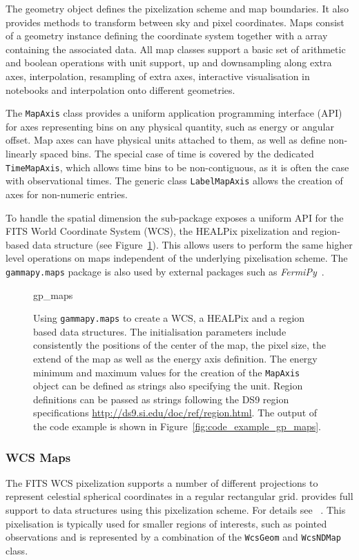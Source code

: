 \documentclass[longauth]{aa}
\newcommand{\code}[1]{\texttt{#1}}
\begin{document}
The geometry object defines the pixelization scheme and map boundaries. It also
provides methods to transform between sky and pixel coordinates. Maps consist
of a geometry instance defining the coordinate system together with a
\numpy array containing the associated data. All map classes support a basic
set of arithmetic and boolean operations with  unit support, up and downsampling
along extra axes, interpolation, resampling of extra axes, interactive visualisation
in notebooks and interpolation onto different geometries.

The \code{MapAxis} class provides a uniform application programming interface
(API) for axes representing
bins on any physical quantity, such as energy or angular offset.
Map axes can have physical units attached to them, as well as define
non-linearly spaced bins. The special case of time is covered by the
dedicated \code{TimeMapAxis}, which allows time bins to be non-contiguous,
as it is often the case with observational times. The generic
class \code{LabelMapAxis} allows the creation of axes for non-numeric entries.

To handle the spatial dimension the sub-package exposes a uniform API for
the FITS World Coordinate System (WCS), the HEALPix pixelization and
region-based data structure (see Figure~\ref{fig*:minted:gp_maps}).
This allows users to perform the same higher level operations on maps
independent of the underlying pixelisation scheme. The \code{gammapy.maps}
package is also used by external packages such as \textit{FermiPy}~\citep{Wood2017}.

\begin{figure}
	\small
	{gp_maps}

	\caption{
        Using \code{gammapy.maps} to create a WCS, a HEALPix and a region
		based data structures. The initialisation parameters include
        consistently the positions of the center of the map, the pixel
        size, the extend of the map as well as the energy axis definition.
        The energy minimum and maximum values for the creation of the
        \code{MapAxis} object can be defined as strings also specifying the
        unit. Region definitions can be passed as strings following
        the DS9 region specifications \url{http://ds9.si.edu/doc/ref/region.html}. The output
		of the code example is shown in Figure~\ref{fig:code_example_gp_maps}.
        }
    \label{fig*:minted:gp_maps}
\end{figure}

\subsubsection{WCS Maps}
The FITS WCS pixelization supports a number of different projections to
represent celestial spherical coordinates in a regular rectangular grid.
\gammapy provides full support to data structures using this pixelization
scheme. For details see ~\cite{Calabretta2002}. This pixelisation
is typically used for smaller regions of interests, such as pointed
observations and is represented by a combination of the
\code{WcsGeom} and \code{WcsNDMap} class.
\end{document}

